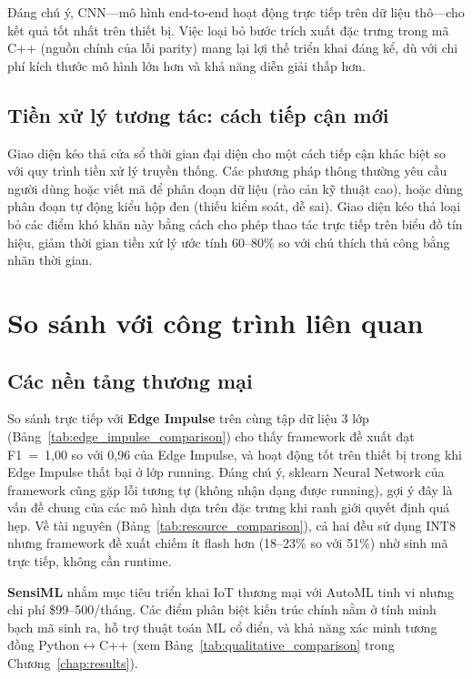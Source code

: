 Đáng chú ý, CNN---mô hình end-to-end hoạt động trực tiếp trên dữ liệu thô---cho kết quả tốt nhất trên thiết bị. Việc loại bỏ bước trích xuất đặc trưng trong mã C++ (nguồn chính của lỗi parity) mang lại lợi thế triển khai đáng kể, dù với chi phí kích thước mô hình lớn hơn và khả năng diễn giải thấp hơn.

\subsection{Tiền xử lý tương tác: cách tiếp cận mới}
Giao diện kéo thả cửa sổ thời gian đại diện cho một cách tiếp cận khác biệt so với quy trình tiền xử lý truyền thống. Các phương pháp thông thường yêu cầu người dùng hoặc viết mã để phân đoạn dữ liệu (rào cản kỹ thuật cao), hoặc dùng phân đoạn tự động kiểu hộp đen (thiếu kiểm soát, dễ sai). Giao diện kéo thả loại bỏ các điểm khó khăn này bằng cách cho phép thao tác trực tiếp trên biểu đồ tín hiệu, giảm thời gian tiền xử lý ước tính 60--80\% so với chú thích thủ công bằng nhãn thời gian.

\section{So sánh với công trình liên quan}

\subsection{Các nền tảng thương mại}
So sánh trực tiếp với \textbf{Edge Impulse} trên cùng tập dữ liệu 3 lớp (Bảng~\ref{tab:edge_impulse_comparison}) cho thấy framework đề xuất đạt F1~=~1,00 so với 0,96 của Edge Impulse, và hoạt động tốt trên thiết bị trong khi Edge Impulse thất bại ở lớp running. Đáng chú ý, sklearn Neural Network của framework cũng gặp lỗi tương tự (không nhận dạng được running), gợi ý đây là vấn đề chung của các mô hình dựa trên đặc trưng khi ranh giới quyết định quá hẹp. Về tài nguyên (Bảng~\ref{tab:resource_comparison}), cả hai đều sử dụng INT8 nhưng framework đề xuất chiếm ít flash hơn (18--23\% so với 51\%) nhờ sinh mã trực tiếp, không cần runtime.

\textbf{SensiML} nhắm mục tiêu triển khai IoT thương mại với AutoML tinh vi nhưng chi phí \$99--500/tháng. Các điểm phân biệt kiến trúc chính nằm ở tính minh bạch mã sinh ra, hỗ trợ thuật toán ML cổ điển, và khả năng xác minh tương đồng Python$\leftrightarrow$C++ (xem Bảng~\ref{tab:qualitative_comparison} trong Chương~\ref{chap:results}).

